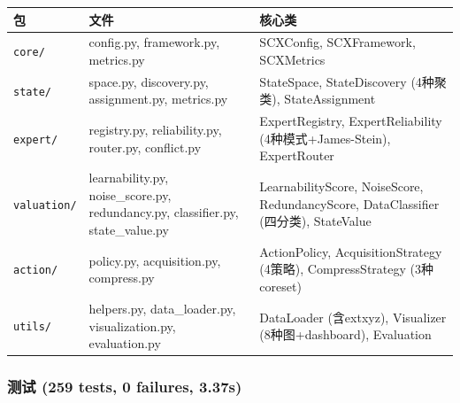 \documentclass[
  12pt,
]{ctexart}
\begin{document}
\begin{longtable}[]{@{}
  >{\raggedright\arraybackslash}p{}
  >{\raggedright\arraybackslash}p{}
  >{\raggedright\arraybackslash}p{}@{}}
\toprule\noalign{}
\begin{minipage}[b]{\linewidth}\raggedright
包
\end{minipage} & \begin{minipage}[b]{\linewidth}\raggedright
文件
\end{minipage} & \begin{minipage}[b]{\linewidth}\raggedright
核心类
\end{minipage} \\
\midrule\noalign{}
\endhead
\bottomrule\noalign{}
\endlastfoot
\texttt{core/} & config.py, framework.py, metrics.py & SCXConfig,
SCXFramework, SCXMetrics \\
\texttt{state/} & space.py, discovery.py, assignment.py, metrics.py &
StateSpace, StateDiscovery (4种聚类), StateAssignment \\
\texttt{expert/} & registry.py, reliability.py, router.py, conflict.py &
ExpertRegistry, ExpertReliability (4种模式+James-Stein), ExpertRouter \\
\texttt{valuation/} & learnability.py, noise\_score.py, redundancy.py,
classifier.py, state\_value.py & LearnabilityScore, NoiseScore,
RedundancyScore, DataClassifier (四分类), StateValue \\
\texttt{action/} & policy.py, acquisition.py, compress.py &
ActionPolicy, AcquisitionStrategy (4策略), CompressStrategy
(3种coreset) \\
\texttt{utils/} & helpers.py, data\_loader.py, visualization.py,
evaluation.py & DataLoader (含extxyz), Visualizer (8种图+dashboard),
Evaluation \\
\end{longtable}

\subsubsection{测试 (259 tests, 0 failures,
3.37s)}\label{ux6d4bux8bd5-259-tests-0-failures-3.37s}
\end{document}
